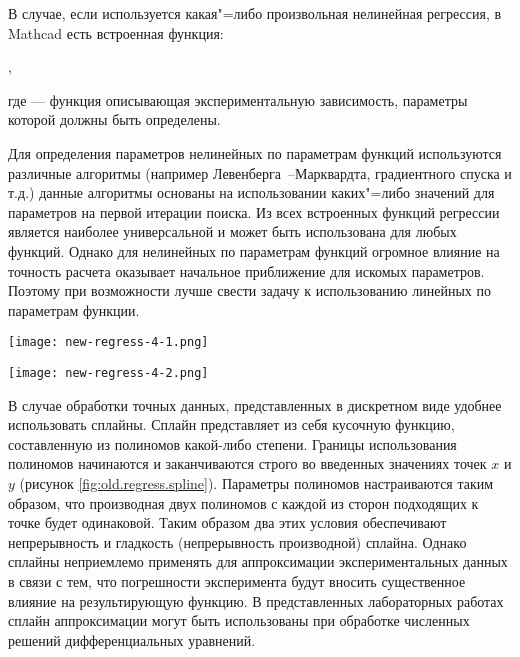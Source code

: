 В случае, если используется какая"=либо произвольная нелинейная регрессия,  в Mathcad есть встроенная функция:
\begin{center}
 ,
\end{center}
где  --- функция описывающая экспериментальную зависимость, параметры  которой должны быть определены.

Для определения параметров нелинейных по параметрам функций используются различные алгоритмы (например Левенберга~--Марквардта, градиентного спуска и т.д.) данные алгоритмы основаны на использовании каких"=либо значений для параметров на первой итерации поиска.
Из всех встроенных функций регрессии  является наиболее универсальной и может быть использована для любых функций. Однако для нелинейных по параметрам функций огромное влияние на точность расчета оказывает начальное приближение   для искомых параметров. Поэтому при возможности лучше свести задачу к  использованию линейных по параметрам функции.


\begin{center}
	\texttt{[image: new-regress-4-1.png]}
\end{center}

\begin{center}
	\texttt{[image: new-regress-4-2.png]}
\end{center}

В случае обработки точных данных, представленных в дискретном виде удобнее использовать сплайны. Сплайн представляет из себя кусочную функцию, составленную из полиномов какой-либо степени. Границы использования полиномов начинаются и заканчиваются строго во введенных значениях точек $x$ и $y$ (рисунок \ref{fig:old.regress.spline}). Параметры полиномов настраиваются таким образом, что производная двух полиномов с каждой из сторон подходящих к точке будет одинаковой.
Таким образом два этих условия обеспечивают непрерывность и гладкость (непрерывность производной) сплайна. Однако сплайны неприемлемо применять для аппроксимации экспериментальных данных в связи с тем, что погрешности эксперимента будут вносить существенное влияние на результирующую функцию. В представленных лабораторных работах сплайн аппроксимации могут быть использованы при обработке численных решений дифференциальных уравнений.

